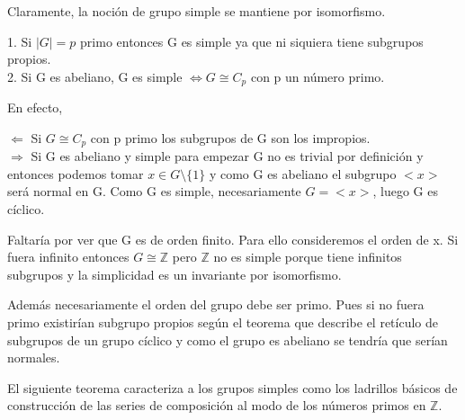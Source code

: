 Claramente, la noción de grupo simple se mantiene por isomorfismo.

\begin{example}
1. Si $|G| = p$ primo entonces G es simple ya que ni siquiera tiene subgrupos propios. \\
2. Si G es abeliano, G es simple $\iff G \cong C_p$ con p un número primo.

En efecto, 

$\Leftarrow$ Si $G \cong C_p$ con p primo los subgrupos de G son los impropios. \\
$\Rightarrow$ Si G es abeliano y simple para empezar G no es trivial por definición y entonces podemos tomar $x \in G \setminus \{1\}$ y como G es abeliano el subgrupo $<x>$ será normal en G. Como G es simple, necesariamente $G = <x>$, luego G es cíclico.

Faltaría por ver que G es de orden finito. Para ello consideremos el orden de x. Si fuera infinito entonces $G \cong \mathbb{Z}$ pero $\mathbb{Z}$ no es simple porque tiene infinitos subgrupos y la simplicidad es un invariante por isomorfismo.

Además necesariamente el orden del grupo debe ser primo. Pues si no fuera primo existirían subgrupo propios según el teorema que describe el retículo de subgrupos de un grupo cíclico y como el grupo es abeliano se tendría que serían normales.
\end{example}

El siguiente teorema caracteriza a los grupos simples como los ladrillos básicos de construcción de las series de composición al modo de los números primos en $\mathbb{Z}$.

